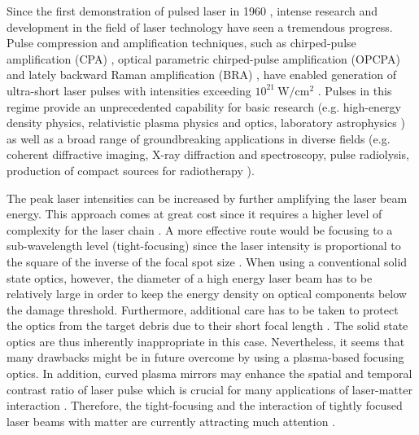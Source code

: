 Since the first demonstration of pulsed laser in 1960 \cite{Maiman1960}, intense research and development in the field of laser technology have seen a tremendous progress. Pulse compression and amplification techniques, such as chirped-pulse amplification (CPA) \cite{StricklandMourou1985}, optical parametric chirped-pulse amplification (OPCPA) \cite{Dubietis1992} and lately backward Raman amplification (BRA) \cite{Malkin1999}, have enabled generation of ultra-short laser pulses with intensities exceeding $ 10^{21} \ \mathrm{W/cm^{2}} $ \cite{Danson2015}. Pulses in this regime provide an unprecedented capability for basic research (e.g. high-energy density physics, relativistic plasma physics and optics, laboratory astrophysics \cite{Council2003, Graziani2014, Lebedev2007, Bridgman1958, Krehl2008, Andreev2006, Weber2013, Bulanov2015, Zakharov2003}) as well as a broad range of groundbreaking applications in diverse fields (e.g. coherent diffractive imaging, X-ray diffraction and spectroscopy, pulse radiolysis, production of compact sources for radiotherapy \cite{Zewail2010, Bulanov2004, Malka2004}).

The peak laser intensities can be increased by further amplifying the laser beam energy. This approach comes at great cost since it requires a higher level of complexity for the laser chain \cite{Fuchs2014}. A more effective route would be focusing to a sub-wavelength level (tight-focusing) since the laser intensity is proportional to the square of the inverse of the focal spot size \cite{Kon2010}. When using a conventional solid state optics, however, the diameter of a high energy laser beam has to be relatively large in order to keep the energy density on optical components below the damage threshold. Furthermore, additional care has to be taken to protect the optics from the target debris due to their short focal length \cite{Liu2011}. The solid state optics are thus inherently inappropriate in this case. Nevertheless, it seems that many drawbacks might be in future overcome by using a plasma-based focusing optics. In addition, curved plasma mirrors may enhance the spatial and temporal contrast ratio of laser pulse which is crucial for many applications of laser-matter interaction \cite{Fuchs2014}. Therefore, the tight-focusing and the interaction of tightly focused laser beams with matter are currently attracting much attention \cite{Popov2008, Popov2009, Lifschitz2016, Yan2005}. 

